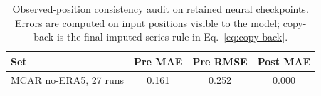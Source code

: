 \begin{table}[t]
  \centering
  \caption{Observed-position consistency audit on retained neural checkpoints. Errors are computed on input positions visible to the model; copy-back is the final imputed-series rule in Eq.~\eqref{eq:copy-back}.}
  \label{tab:observed-consistency}
  \scriptsize
  \begin{tabular}{@{}lccc@{}}
    \toprule
    Set & Pre MAE & Pre RMSE & Post MAE \\
    \midrule
    MCAR no-ERA5, 27 runs & 0.161 & 0.252 & 0.000 \\
    \bottomrule
  \end{tabular}
\end{table}
